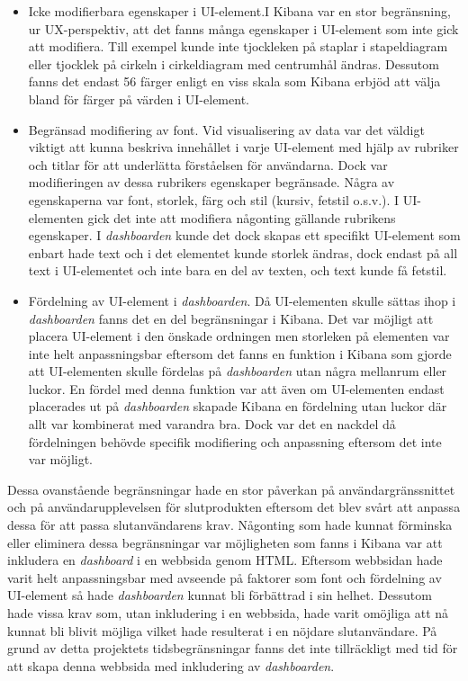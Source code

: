 \documentclass[12pt]{kththesis}
\begin{document}
\begin{itemize}
\item Icke modifierbara egenskaper i UI-element.I Kibana var en stor begränsning, ur UX-perspektiv, att det fanns många egenskaper i UI-element som inte gick att modifiera. Till exempel kunde inte tjockleken på staplar i stapeldiagram eller tjocklek på cirkeln i cirkeldiagram med centrumhål ändras. Dessutom fanns det endast 56 färger enligt en viss skala som Kibana erbjöd att välja bland för färger på värden i UI-element.

\item Begränsad modifiering av font. Vid visualisering av data var det väldigt viktigt att kunna beskriva innehållet i varje UI-element med hjälp av rubriker och titlar för att underlätta förståelsen för användarna. Dock var modifieringen av dessa rubrikers egenskaper begränsade. Några av egenskaperna var font, storlek, färg och stil (kursiv, fetstil o.s.v.). I UI-elementen gick det inte att modifiera någonting gällande rubrikens egenskaper. I \textit{dashboarden} kunde det dock skapas ett specifikt UI-element som enbart hade text och i det elementet kunde storlek ändras, dock endast på all text i UI-elementet och inte bara en del av texten, och text kunde få fetstil.

\item Fördelning av UI-element i \textit{dashboarden}. Då UI-elementen skulle sättas ihop i \textit{dashboarden} fanns det en del begränsningar i Kibana. Det var möjligt att placera UI-element i den önskade ordningen men storleken på elementen var inte helt anpassningsbar eftersom det fanns en funktion i Kibana som gjorde att UI-elementen skulle fördelas på \textit{dashboarden} utan några mellanrum eller luckor. En fördel med denna funktion var att även om UI-elementen endast placerades ut på \textit{dashboarden} skapade Kibana en fördelning utan luckor där allt var kombinerat med varandra bra. Dock var det en nackdel då fördelningen behövde specifik modifiering och anpassning eftersom det inte var möjligt. 
\end{itemize}

Dessa ovanstående begränsningar hade en stor påverkan på användargränssnittet och på användarupplevelsen för slutprodukten eftersom det blev svårt att anpassa dessa för att passa slutanvändarens krav. Någonting som hade kunnat förminska eller eliminera dessa begränsningar var möjligheten som fanns i Kibana var att inkludera en \textit{dashboard} i en webbsida genom HTML. Eftersom webbsidan hade varit helt anpassningsbar med avseende på faktorer som font och fördelning av UI-element så hade \textit{dashboarden} kunnat bli förbättrad i sin helhet. Dessutom hade vissa krav som, utan inkludering i en webbsida, hade varit omöjliga att nå kunnat bli blivit möjliga vilket hade resulterat i en nöjdare slutanvändare. På grund av detta projektets tidsbegränsningar fanns det inte tillräckligt med tid för att skapa denna webbsida med inkludering av \textit{dashboarden}.  
\end{document}

